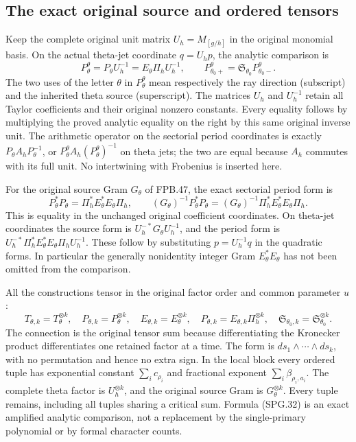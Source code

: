 \subsection{The exact original source and ordered tensors}

Keep the complete original unit matrix \(U_h=M_{[g/h]}\) in the
original monomial basis. On the actual theta-jet coordinate
\(q=U_hp\), the analytic comparison is
\[
 P_\theta^\theta=P_\theta U_h^{-1}
       =E_\theta\Pi_h U_h^{-1},
 \qquad
 P_{\theta_0+}^\theta
       =\mathfrak S_{\theta_0}P_{\theta_0-}^\theta.
 \tag{SPG.30}\label{GraphV2:eq:spg-theta}
\]
The two uses of the letter \(\theta\) in \(P_\theta^\theta\)
mean respectively the ray direction (subscript) and the inherited
theta source (superscript). The matrices \(U_h\) and \(U_h^{-1}\)
retain all Taylor coefficients and their original nonzero constants.
Every equality follows by multiplying the proved analytic equality
on the right by this same original inverse unit. The arithmetic
operator on the sectorial period coordinates is exactly
\(P_\theta A_h P_\theta^{-1}\), or
\(P_\theta^\theta A_h(P_\theta^\theta)^{-1}\) on theta jets;
the two are equal because \(A_h\) commutes with its full unit.
No intertwining with Frobenius is inserted here.

For the original source Gram \(G_\theta\) of FPB.47, the exact
sectorial period form is
\[
 P_\theta^*P_\theta
      =\Pi_h^* E_\theta^*E_\theta\Pi_h,
 \qquad
 (G_\theta)^{-1}P_\theta^*P_\theta
      =(G_\theta)^{-1}\Pi_h^*E_\theta^*E_\theta\Pi_h.
 \tag{SPG.31}\label{GraphV2:eq:spg-metric}
\]
This is equality in the unchanged original coefficient coordinates.
On theta-jet coordinates the source form is
\(U_h^{-*}G_\theta U_h^{-1}\), and the period form is
\(U_h^{-*}\Pi_h^*E_\theta^*E_\theta\Pi_hU_h^{-1}\).
These follow by substituting \(p=U_h^{-1}q\) in the quadratic
forms. In particular the generally nonidentity integer Gram
\(E_\theta^*E_\theta\) has not been omitted from the comparison.

All the constructions tensor in the original factor order and common
parameter \(u\):
\[
 T_{\theta,k}=T_\theta^{\otimes k},\quad
 P_{\theta,k}=P_\theta^{\otimes k},\quad
 E_{\theta,k}=E_\theta^{\otimes k},\quad
 P_{\theta,k}=E_{\theta,k}\Pi_h^{\otimes k},\quad
 \mathfrak S_{\theta_0,k}=\mathfrak S_{\theta_0}^{\otimes k}.
 \tag{SPG.32}\label{GraphV2:eq:spg-tensor}
\]
The connection is the original tensor sum because differentiating
the Kronecker product differentiates one retained factor at a time.
The form is \(ds_1\wedge\cdots\wedge ds_k\), with no
permutation and hence no extra sign. In the local block every
ordered tuple has exponential constant \(\sum_i c_{\rho_i}\)
and fractional exponent \(\sum_i\beta_{\rho_i,a_i}\). The
complete theta factor is \(U_h^{\otimes k}\), and the original
source Gram is \(G_\theta^{\otimes k}\). Every tuple remains,
including all tuples sharing a critical sum. Formula (SPG.32) is an
exact amplified analytic comparison, not a replacement by the
single-primary polynomial or by formal character counts.

